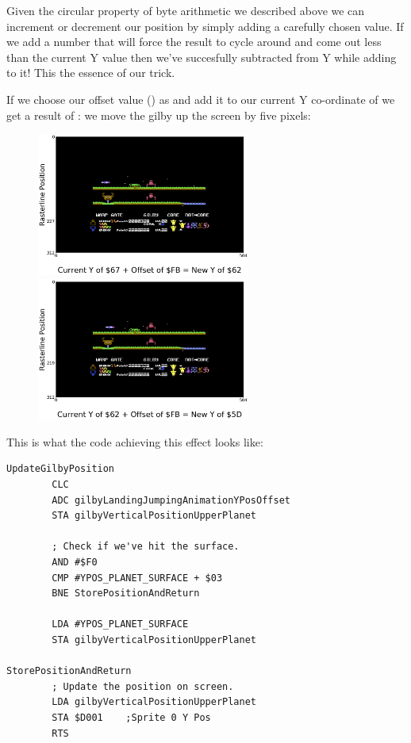 Given the circular property of byte arithmetic we described above we can increment or decrement our position by simply adding a carefully
chosen value. If we add a number that will force the result to cycle around and come out less than the current Y value then we've
succesfully subtracted from Y while adding to it! This the essence of our trick.

If we choose our offset value () as  and add it to our current Y co-ordinate
of  we get a result of : we move the gilby up the screen by five pixels:

\begin{figure}[H]
    \centering
      \includegraphics[width=7cm]{main_game/gilby_jumping/gilby_jumping41.png}%
      \includegraphics[width=7cm]{main_game/gilby_jumping/gilby_jumping42.png}%
\end{figure}

This is what the code achieving this effect looks like:

\begin{lstlisting}
UpdateGilbyPosition
        CLC
        ADC gilbyLandingJumpingAnimationYPosOffset
        STA gilbyVerticalPositionUpperPlanet

        ; Check if we've hit the surface.
        AND #$F0
        CMP #YPOS_PLANET_SURFACE + $03
        BNE StorePositionAndReturn

        LDA #YPOS_PLANET_SURFACE
        STA gilbyVerticalPositionUpperPlanet

StorePositionAndReturn   
        ; Update the position on screen.
        LDA gilbyVerticalPositionUpperPlanet
        STA $D001    ;Sprite 0 Y Pos
        RTS
\end{lstlisting}

